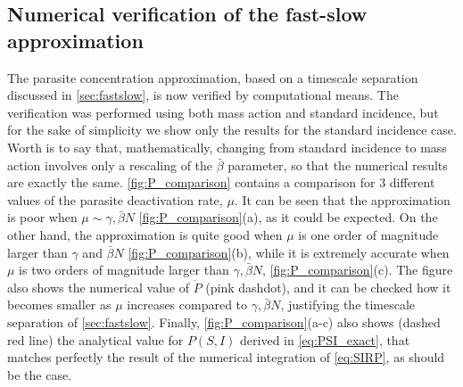 \subsection{Numerical verification of the fast-slow approximation}

The parasite concentration approximation, based on a timescale separation
discussed in \cref{sec:fastslow}, is now verified by computational means. The
verification was performed using both mass action and standard incidence, but
for the sake of simplicity we show only the results for the standard incidence
case. Worth is to say that, mathematically, changing from standard incidence to
mass action involves only a rescaling of the $\bar{\beta}$ parameter, so that
the numerical results are exactly the same. \cref{fig:P_comparison} contains a
comparison for $3$ different values of the parasite deactivation rate, $\mu$.
It can be seen that the approximation is poor when $\mu\sim
    \gamma,\bar{\beta}N$ \cref{fig:P_comparison}(a), as it could be expected.
On
the other hand, the approximation is quite good when $\mu$ is one order of
magnitude larger than $\gamma$ and $\bar{\beta}N$ \cref{fig:P_comparison}(b),
while it is extremely accurate when $\mu$ is two orders of magnitude larger
than $\gamma,\bar{\beta}N$, \cref{fig:P_comparison}(c). The figure also shows
the numerical value of $\dot{P}$ (pink dashdot), and it can be checked how it
becomes smaller as $\mu$ increases compared to $\gamma,\bar{\beta}N$,
justifying the timescale separation of \cref{sec:fastslow}. Finally,
\cref{fig:P_comparison}(a-c) also shows (dashed red line) the analytical value
for $P(S,I)$ derived in \cref{eq:PSI_exact}, that matches perfectly the result
of the numerical integration of \cref{eq:SIRP}, as should be the case.

